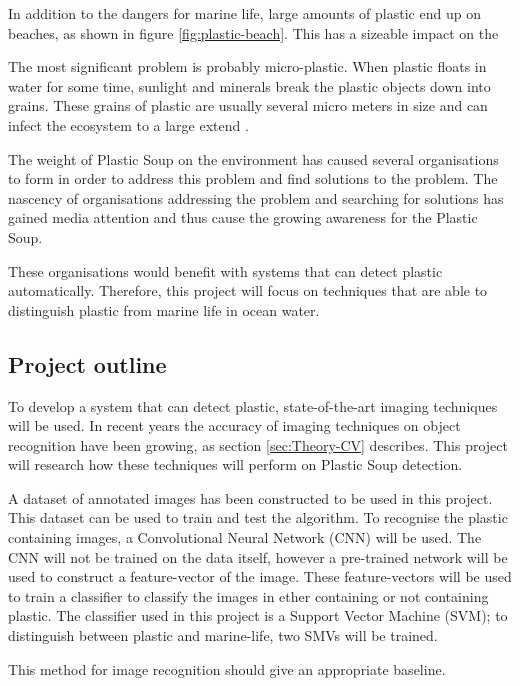 In addition to the dangers for marine life, large amounts of plastic end up on beaches, as shown in figure \ref{fig:plastic-beach}.
This has a sizeable impact on the 

The most significant problem is probably micro-plastic.
When plastic floats in water for some time, sunlight and minerals break the plastic objects down into grains.
These grains of plastic are usually several micro meters in size and can infect the ecosystem to a large extend \citet{moore2011plastic}.

The weight of Plastic Soup on the environment has caused several organisations to form in order to address this problem and find solutions to the problem.
The nascency of organisations addressing the problem and searching for solutions has gained media attention and thus cause the growing awareness for the Plastic Soup.

These organisations would benefit with systems that can detect plastic automatically.
Therefore, this project will focus on techniques that are able to distinguish plastic from marine life in ocean water.

\subsection{Project outline}
\label{sec:Intro-Me}
To develop a system that can detect plastic, state-of-the-art imaging techniques will be used.
In recent years the accuracy of imaging techniques on object recognition have been growing, as section \ref{sec:Theory-CV} describes.
This project will research how these techniques will perform on Plastic Soup detection.

A dataset of annotated images has been constructed to be used in this project.
This dataset can be used to train and test the algorithm.
To recognise the plastic containing images, a Convolutional Neural Network (CNN) will be used.
The CNN will not be trained on the data itself, however a pre-trained network will be used to construct a feature-vector of the image.
These feature-vectors will be used to train a classifier to classify the images in ether containing or not containing plastic.
The classifier used in this project is a Support Vector Machine (SVM); to distinguish between plastic and marine-life, two SMVs will be trained.

This method for image recognition should give an appropriate baseline.

